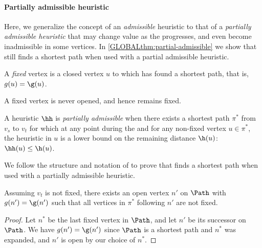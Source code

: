 \paragraph{Partially admissible heuristic} \label{GLOBALsec:partial-admissible}

Here, we generalize the concept of an \emph{admissible} heuristic to that of a
\emph{partially admissible heuristic} that may change value as the \A
progresses, and even become inadmissible in some vertices.
In \cref{GLOBALthm:partial-admissible} we show that \A still finds a shortest path
when used with a partial admissible heuristic.

\begin{definition}
  A \emph{fixed} vertex is a closed vertex $u$ to which \A has found a shortest path,
  that is, $g(u) = \g(u)$.
\end{definition}
A fixed vertex is never opened, and hence remains fixed.

\begin{definition}
  A heuristic $\hh$ is \emph{partially admissible} when there exists a shortest
  path $\pi^*$ from  $v_s$ to $v_t$ for which at any point during the \A and for
  any non-fixed vertex $u\in \pi^*$, the heuristic in $u$ is a lower bound on
  the remaining distance $\h(u)$: $\hh(u) \leq \h(u)$.
\end{definition}

We follow the structure and notation of \citet{hart1968formal} to prove that \A
finds a shortest path when used with a partially admissible heuristic.
\begin{lem}\label{GLOBALlemma1}
  Assuming $v_t$ is not fixed,
  there exists an open vertex $n'$ on $\Path$ with $g(n') = \g(n')$ such that
  all vertices in $\pi^*$ following $n'$ are not fixed.
\end{lem}
\begin{proof}
  Let $n^*$ be the last fixed vertex in $\Path$, and let
  $n'$ be its successor on $\Path$. We have $g(n') = \g(n')$ since $\Path$ is a
  shortest path and $n^*$ was expanded, and $n'$ is open by our choice of $n^*$.
\end{proof}

